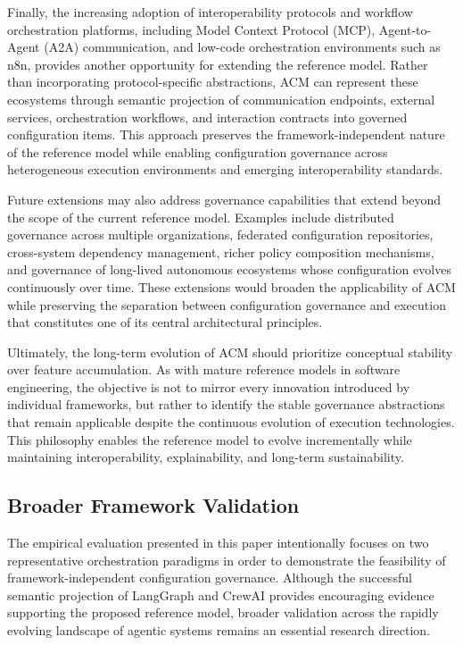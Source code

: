 \documentclass[10pt]{article}
\begin{document}
Finally, the increasing adoption of interoperability protocols and workflow orchestration platforms, including Model Context Protocol (MCP), Agent-to-Agent (A2A) communication, and low-code orchestration environments such as n8n, provides another opportunity for extending the reference model. Rather than incorporating protocol-specific abstractions, ACM can represent these ecosystems through semantic projection of communication endpoints, external services, orchestration workflows, and interaction contracts into governed configuration items. This approach preserves the framework-independent nature of the reference model while enabling configuration governance across heterogeneous execution environments and emerging interoperability standards.

Future extensions may also address governance capabilities that extend beyond the scope of the current reference model. Examples include distributed governance across multiple organizations, federated configuration repositories, cross-system dependency management, richer policy composition mechanisms, and governance of long-lived autonomous ecosystems whose configuration evolves continuously over time. These extensions would broaden the applicability of ACM while preserving the separation between configuration governance and execution that constitutes one of its central architectural principles.

Ultimately, the long-term evolution of ACM should prioritize conceptual stability over feature accumulation. As with mature reference models in software engineering, the objective is not to mirror every innovation introduced by individual frameworks, but rather to identify the stable governance abstractions that remain applicable despite the continuous evolution of execution technologies. This philosophy enables the reference model to evolve incrementally while maintaining interoperability, explainability, and long-term sustainability.

\subsection{Broader Framework Validation}
\label{sec:future_framework_validation}

The empirical evaluation presented in this paper intentionally focuses on two representative orchestration paradigms in order to demonstrate the feasibility of framework-independent configuration governance. Although the successful semantic projection of LangGraph and CrewAI provides encouraging evidence supporting the proposed reference model, broader validation across the rapidly evolving landscape of agentic systems remains an essential research direction.
\end{document}
